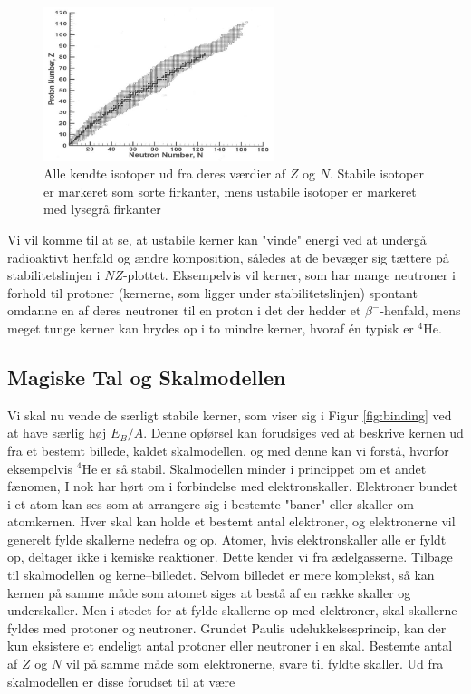 \begin{figure}[h!]
  \centering
  \includegraphics[width=0.6\textwidth]{KernePartikel/known_nucleides.jpg}
  \caption{ Alle kendte isotoper ud fra deres værdier af $Z$ og $N$. Stabile isotoper er markeret som sorte firkanter, mens ustabile isotoper er markeret med lysegrå firkanter}
  \label{fig:known_iso}
\end{figure}


Vi vil komme til at se, at ustabile kerner kan "vinde"  energi ved at undergå radioaktivt henfald og ændre komposition, således at de bevæger sig tættere på stabilitetslinjen i $NZ$-plottet. Eksempelvis vil kerner, som har mange neutroner i forhold til protoner (kernerne, som ligger under stabilitetslinjen) spontant omdanne en af deres neutroner til en proton i det der hedder et $\beta^-$-henfald, mens meget tunge kerner kan brydes op i to mindre kerner, hvoraf én typisk er $^4\text{He}$.  

\subsection{Magiske Tal og Skalmodellen}

Vi skal nu vende de særligt stabile kerner, som viser sig i Figur \ref{fig:binding} ved at have særlig høj $E_B/A$. Denne opførsel kan forudsiges ved at beskrive kernen ud fra et bestemt billede, kaldet skalmodellen, og med denne kan vi forstå, hvorfor eksempelvis $^4\text{He}$ er så stabil.
Skalmodellen minder i princippet om et andet fænomen, I nok har hørt om i forbindelse med elektronskaller. Elektroner bundet i et atom kan ses som at arrangere sig i bestemte "baner" eller skaller om atomkernen. Hver skal kan holde et bestemt antal elektroner, og elektronerne vil generelt fylde skallerne nedefra og op. Atomer, hvis elektronskaller alle er fyldt op, deltager ikke i kemiske reaktioner. Dette kender vi fra ædelgasserne.
Tilbage til skalmodellen og kerne--billedet. Selvom billedet er mere komplekst, så kan kernen på samme måde som atomet siges at bestå af en række skaller og underskaller. Men i stedet for at fylde skallerne op med elektroner, skal skallerne fyldes med protoner og neutroner. Grundet Paulis udelukkelsesprincip, kan der kun eksistere et endeligt antal protoner eller neutroner i en skal. Bestemte antal af $Z$ og $N$ vil på samme måde som elektronerne, svare til fyldte skaller. Ud fra skalmodellen er disse forudset til at være


